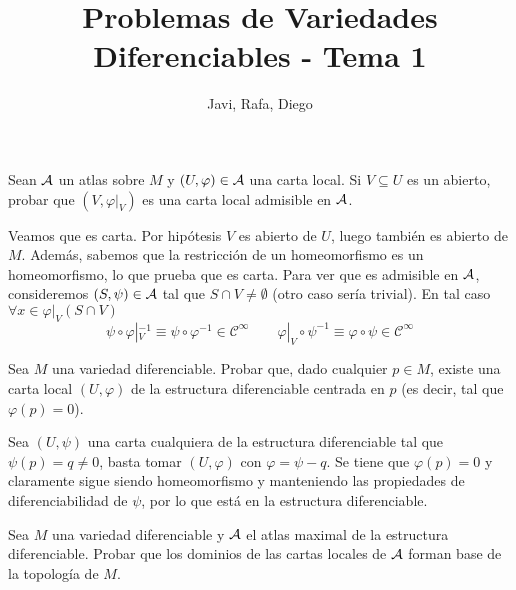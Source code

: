 \documentclass[twoside]{article}
\begin{document}
\title{Problemas de Variedades Diferenciables - Tema 1}
\author{Javi, Rafa, Diego}
\maketitle



\begin{ejercicio}{1}\label{1}
Sean $\mathcal{A}$ un atlas sobre $M$ y $(U,\varphi) \in \mathcal{A}$ una carta local. Si $V \subseteq U$ es un abierto, probar que
$(V, \varphi|_V )$ es una carta local admisible en $\mathcal{A}$.
\end{ejercicio}
\begin{solucion}
Veamos que es carta. Por hipótesis $V$ es abierto de $U$, luego también es abierto de $M$. Además, sabemos que la restricción de un homeomorfismo es un homeomorfismo, lo que prueba que es carta. Para ver que es admisible en $\mathcal{A}$, consideremos $(S,\psi)\in \mathcal{A}$ tal que $S\cap V \neq \emptyset$ (otro caso sería trivial). En tal caso $\forall x \in \varphi|_V (S\cap V)$
$$
\psi \circ \varphi|_V^{-1}\equiv \psi \circ \varphi^{-1} \in \mathcal{C}^\infty \qquad \varphi|_V \circ \psi^{-1}\equiv \varphi \circ \psi \in \mathcal{C}^\infty
$$

\end{solucion}

\newpage

\begin{ejercicio}{2}
Sea $M$ una variedad diferenciable. Probar que, dado cualquier $p \in M$, existe una carta local
$(U, \varphi)$ de la estructura diferenciable centrada en $p$ (es decir, tal que $\varphi(p) = 0$).
\end{ejercicio}
\begin{solucion}

Sea $(U,\psi)$ una carta cualquiera de la estructura diferenciable tal que $\psi(p)=q\neq 0$, basta tomar $(U,\varphi)$ con $\varphi=\psi-q$. Se tiene que $\varphi(p)=0$ y claramente sigue siendo homeomorfismo y manteniendo las propiedades de diferenciabilidad de $\psi$, por lo que está en la estructura diferenciable.
\end{solucion}

\newpage

\begin{ejercicio}{3}
Sea $M$ una variedad diferenciable y $\mathcal{A}$ el atlas maximal de la estructura diferenciable. Probar
que los dominios de las cartas locales de $\mathcal{A}$ forman base de la topología de $M$.
\end{ejercicio}
\begin{solucion}
\end{solucion}
\end{document}
